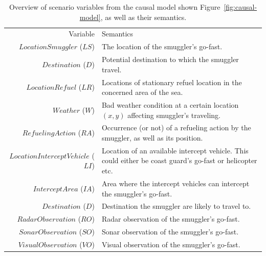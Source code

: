 \documentclass[conference]{IEEEtran}
\begin{document}
\begin{table}[!ht]
 \centering
 \caption{Overview of scenario variables from the causal model shown Figure~\ref{fig:causal-model}, as well as their semantics.}
 \begin{tabular}[!ht]{rp{4cm}}
\toprule
 Variable & Semantics \\
\cmidrule(r){1-1}
\cmidrule(l){2-2}
$LocationSmuggler$ ($LS$) &
The location of the smuggler's go-fast. \\
$Destination$ ($D$) &
Potential destination to which the smuggler travel. \\
$LocationRefuel$ ($LR$) &
Locations of stationary refuel location in the concerned area of the sea. \\
$Weather$ ($W$) &
Bad weather condition at a certain location $(x,y)$ affecting smuggler's traveling. \\
$RefuelingAction$ ($RA$) &
Occurrence (or not) of a refueling action by the smuggler, as well as its position. \\
$LocationInterceptVehicle$ ($LI$) &
Location of an available intercept vehicle. This could either be coast guard's go-fast or helicopter etc. \\
$InterceptArea$ ($IA$) &
Area where the intercept vehicles can intercept the smuggler's go-fast. \\
$Destination$ ($D$) &
Destination the smuggler are likely to travel to. \\
$RadarObservation$ ($RO$) &
Radar observation of the smuggler's go-fast. \\
$SonarObservation$ ($SO$) &
Sonar observation of the smuggler's go-fast. \\
$VisualObservation$ ($VO$) &
Visual observation of the smuggler's go-fast. \\
\bottomrule
\end{tabular}
\label{tab:scenario-variables}
\end{table}




\end{document}
